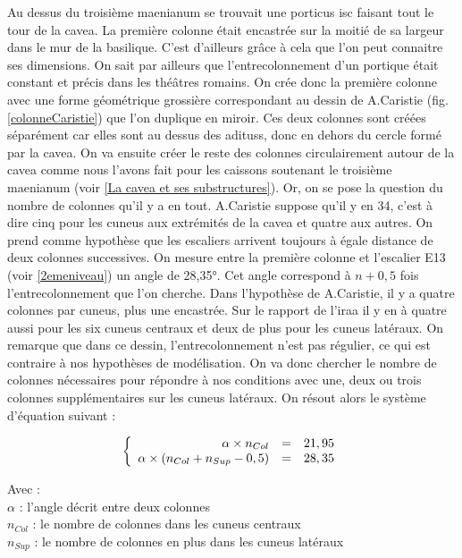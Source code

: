 Au dessus du troisième \gls{maenianum} se trouvait une \gls{porticus isc} faisant tout le tour de la \gls{cavea}. La première colonne était encastrée sur la moitié de sa largeur dans le mur de la basilique. C'est d'ailleurs grâce à cela que l'on peut connaitre ses dimensions. On sait par ailleurs que l'entrecolonnement d'un portique était constant et précis dans les théâtres romains. On crée donc la première colonne avec une forme géométrique grossière correspondant au dessin de A.Caristie (fig. \ref{colonneCaristie}) que l'on duplique en miroir. Ces deux colonnes sont créées séparément car elles sont au dessus des \glspl{aditus}, donc en dehors du cercle formé par la \gls{cavea}. On va ensuite créer le reste des colonnes circulairement autour de la \gls{cavea} comme nous l'avons fait pour les caissons soutenant le troisième \gls{maenianum} (voir \ref{La cavea et ses substructures}). Or, on se pose la question du nombre de colonnes qu'il y a en tout. A.Caristie suppose qu'il y en 34, c'est à dire cinq pour les \gls{cuneus} aux extrémités de la \gls{cavea} et quatre aux autres. On prend comme hypothèse que les escaliers arrivent toujours à égale distance de deux colonnes successives. On mesure entre la première colonne et l'escalier E13 (voir \ref{2emeniveau}) un angle de 28,35°. Cet angle correspond à $n+0,5$ fois l'entrecolonnement que l'on cherche. Dans l'hypothèse de A.Caristie, il y a quatre colonnes par \gls{cuneus}, plus une encastrée. Sur le rapport de l'\gls{iraa} \cite[Pl. XX]{orangePl} il y en à quatre aussi pour les six \gls{cuneus} centraux et deux de plus pour les \gls{cuneus} latéraux. On remarque que dans ce dessin, l'entrecolonnement n'est pas régulier, ce qui est contraire à nos hypothèses de modélisation. On va donc chercher le nombre de colonnes nécessaires pour répondre à nos conditions avec une, deux ou trois colonnes supplémentaires sur les \gls{cuneus} latéraux. On résout alors le système d'équation suivant :


\begin{equation}
  \left \{
   \begin{array}{r c l}
      \alpha \times n_{Col}  & = & 21,95 \\
      \alpha \times (n_{Col} + n_{Sup} - 0,5)   & = &  28,35
   \end{array}
   \right .
\end{equation}

Avec : \\
$\alpha$ : l'angle décrit entre deux colonnes \\
$n_{Col}$ : le nombre de colonnes dans les cuneus centraux \\
$n_{Sup}$ : le nombre de colonnes en plus dans les cuneus latéraux \\

